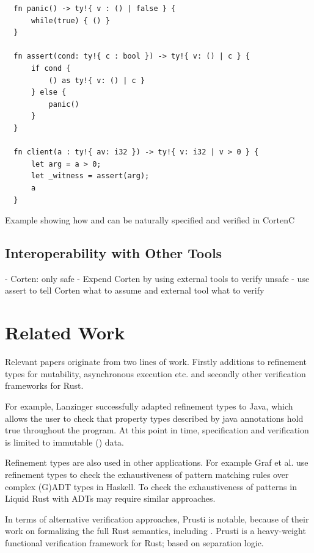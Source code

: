 \documentclass[twoside, english]{sdqthesis}
\theoremstyle{definition}
\begin{document}
\begin{listing}[ht]
  \begin{verbatim}
  fn panic() -> ty!{ v : () | false } {
      while(true) { () }
  }

  fn assert(cond: ty!{ c : bool }) -> ty!{ v: () | c } {
      if cond {
          () as ty!{ v: () | c }
      } else {
          panic()
      }
  }

  fn client(a : ty!{ av: i32 }) -> ty!{ v: i32 | v > 0 } {
      let arg = a > 0;
      let _witness = assert(arg);
      a
  }
  \end{verbatim}
  \caption{Example showing how  and  can be naturally specified and verified in CortenC}
  \label{lst:eval-builtins}
\end{listing}


\section{Interoperability with Other Tools}

- Corten: only safe
- Expend Corten by using external tools to verify unsafe
- use assert to tell Corten what to assume and external tool what to verify

\chapter{Related Work} \label{ch:related-work}

Relevant papers originate from two lines of work. Firstly additions to refinement types for mutability, asynchronous execution etc. and secondly other verification frameworks for Rust.

For example, Lanzinger \cite{lanzinger_property_2021} successfully adapted refinement types to Java, which allows the user to check that property types described by java annotations hold true throughout the program. At this point in time, specification and verification is limited to immutable () data.



Refinement types are also used in other applications. For example Graf et al. \cite{graf_lower_2020} use refinement types to check the exhaustiveness of pattern matching rules over complex (G)ADT types in Haskell. To check the exhaustiveness of patterns in Liquid Rust with ADTs may require similar approaches.

In terms of alternative verification approaches, Prusti\cite{astrauskas_leveraging_2019} is notable, because of their work on formalizing the full Rust semantics, including . Prusti is a heavy-weight functional verification framework for Rust; based on separation logic.
\end{document}
